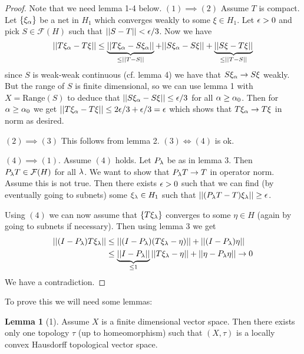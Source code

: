 \documentclass[10pt,english,a4paper]{article}
\theoremstyle{definition}
\newtheorem*{lemma}{Lemma}
\def\Ff{\mathcal{F}}
\begin{document}
\begin{proof}
    Note that we need lemma 1-4 below. 
    $(1)\implies (2)$ Assume $T$ is compact. Let $\{\xi_{\alpha}\}$ be a net in $H_1$ which 
    converges weakly to some $\xi\in H_1$. Let $\epsilon > 0$ and pick 
    $S \in \Ff(H)$ such that $||S-T|| < \epsilon/3$. Now we have 
\[ ||T\xi_{\alpha} - T\xi || \leq \underbrace{||T\xi_{\alpha} - S\xi_{\alpha}||}_{\leq ||T-S||}
+ ||S\xi_{\alpha} - S\xi|| + \underbrace{||S\xi-T\xi||}_{\leq ||T-S||}\]
since $S$ is weak-weak continuous (cf. lemma 4) we have that $S\xi_{\alpha}\to S\xi$ 
weakly. But the range of $S$ is finite dimensional, so we can use lemma 1 with 
$X = \text{Range}(S)$ to deduce that $||S\xi_{\alpha}-S\xi||\leq \epsilon/3$ for all 
$\alpha \geq \alpha_0$. Then for $\alpha \geq \alpha_0$ we get 
$||T\xi_{\alpha} - T\xi|| \leq 2\epsilon/3 + \epsilon/3 = \epsilon$ which shows that 
$T\xi_{\alpha} \to T\xi$ in norm as desired.

$(2)\implies (3)$ This follows from lemma 2. $(3) \iff (4)$ is ok. 

$(4) \implies (1)$. Assume $(4)$ holds. 
Let $P_{\lambda}$ be as in lemma 3. Then $P_{\la}T \in \Ff(H)$ for all $\lambda$. 
We want to show that $P_{\lambda}T \to T$ in operator norm. Assume this is not true. 
Then there exists $\epsilon > 0$ such that we can find
(by eventually going to subnets) some $\xi_{\lambda} \in H_1$ such that $||(P_{\lambda}T-T)\xi_{\lambda}||\geq \epsilon$.

Using $(4)$ we can now assume that $\{T\xi_{\lambda}\}$ converges to some $\eta \in H$
(again by going to subnets if necessary). Then using lemma 3 we get 
\begin{align*}
    ||(I-P_{\lambda})T\xi_{\lambda}|| &\leq 
    ||(I-P_{\lambda})(T\xi_{\lambda}-\eta)|| + ||(I-P_{\lambda})\eta|| \\
    &\leq \underbrace{||I-P_{\lambda}||}_{\leq 1} ||T\xi_{\lambda} -\eta|| +
    ||\eta-P_{\lambda}\eta|| \to 0
\end{align*}
We have  a contradiction. 


 
\end{proof}


To prove this we will need some lemmas:
\begin{lemma}[1]
    Assume $X$ is a finite dimensional vector space. Then there exists only one 
    topology $\tau$ (up to homeomorphism) such that $(X,\tau)$ is a locally 
    convex Hausdorff topological vector space.
\end{lemma}
\end{document}
